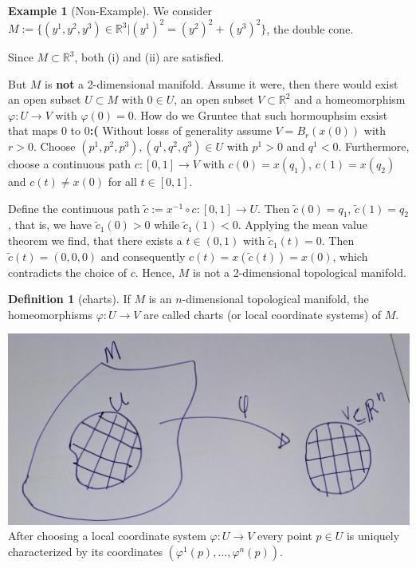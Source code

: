 \documentclass[
]{book}
\theoremstyle{definition}
\newtheorem{definition}{Definition}[chapter]
\theoremstyle{definition}
\newtheorem{example}{Example}[chapter]
\theoremstyle{definition}
\theoremstyle{definition}
\theoremstyle{remark}
\begin{document}
\begin{example}[Non-Example]
\protect\hypertarget{exm:unnamed-chunk-10}{}\label{exm:unnamed-chunk-10}We consider \(M := \{ (y^1, y^2, y^3) \in \mathbb{R}^3 | (y^1)^2 = (y^2)^2 + (y^3)^2 \}\), the double cone.

Since \(M \subset \mathbb{R}^3\), both (i) and (ii) are satisfied.

But \(M\) is \textbf{not} a 2-dimensional manifold. Assume it were, then there would exist an open subset \(U \subset M\) with \(0 \in U\), an open subset \(V \subset \mathbb{R}^2\) and a homeomorphism \(\varphi : U \rightarrow V\) with \(\varphi(0) = 0\).
{How do we Gruntee that such hormouphsim exsist that maps 0 to 0\textbf{:(}}
Without losss of generality assume \(V = B_r(x(0))\) with \(r > 0\). Choose \((p^1,p^2,p^3), (q^1,q^2,q^3) \in U\) with \(p^1 > 0\) and \(q^1 < 0\). Furthermore, choose a continuous path \(c : [0, 1] \rightarrow V\) with \(c(0) = x(q_1)\), \(c(1) = x(q_2)\) and \(c(t) \neq x(0)\) for all \(t \in [0, 1]\).

Define the continuous path \(\tilde{c} := x^{-1} \circ c : [0, 1] \rightarrow U\). Then \(\tilde{c}(0) = q_1\), \(\tilde{c}(1) = q_2\), that is, we have \(\tilde{c}_1(0) > 0\) while \(\tilde{c}_1(1) < 0\). Applying the mean value theorem we find, that there exists a \(t \in (0, 1)\) with \(\tilde{c}_1(t) = 0\). Then \(\tilde{c}(t) = (0, 0, 0)\) and consequently \(c(t) = x(\tilde{c}(t)) = x(0)\), which contradicts the choice of \(c\). Hence, \(M\) is not a 2-dimensional topological manifold.
\end{example}

\begin{definition}[charts]
\protect\hypertarget{def:unnamed-chunk-11}{}\label{def:unnamed-chunk-11}If \(M\) is an \(n\)-dimensional topological manifold, the homeomorphisms \(\varphi : U \to V\) are called charts (or local coordinate systems) of \(M\).
\end{definition}

\includegraphics{figures/ch1/fig06.jpg}
After choosing a local coordinate system \(\varphi : U \rightarrow V\) every point \(p \in U\) is uniquely characterized by its coordinates \((\varphi^1(p), \ldots , \varphi^n(p))\).
\end{document}
